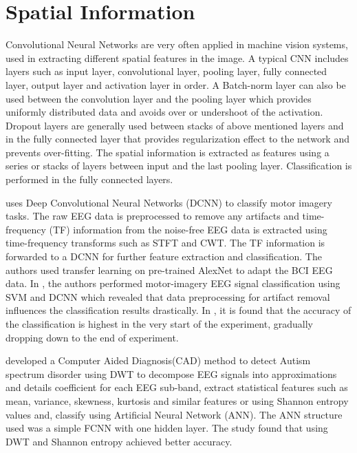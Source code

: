 \section{Spatial Information}

Convolutional Neural Networks are very often applied in machine vision systems, used in extracting different spatial features in the image. A typical CNN includes layers such as input layer, convolutional layer, pooling layer, fully connected layer, output layer and activation layer in order. A Batch-norm layer can also be used between the convolution layer and the pooling layer which provides uniformly distributed data and avoids over or undershoot of the activation. Dropout layers are generally used between stacks of above mentioned layers and in the fully connected layer that provides regularization effect to the network and prevents over-fitting. The spatial information is extracted as features using a series or stacks of layers between input and the last pooling layer. Classification is performed in the fully connected layers. 

\cite{2019_MI_CNN_WT} uses Deep Convolutional Neural Networks (DCNN) to classify motor imagery tasks. The raw EEG data is preprocessed to remove any artifacts and time-frequency (TF)  information from the noise-free EEG data is extracted using time-frequency transforms such as STFT and CWT. The TF information is forwarded to a DCNN for further feature extraction and classification. The authors used transfer learning on pre-trained AlexNet to adapt the BCI EEG data. In \cite{2018_BCI_SVM_DNN}, the authors performed motor-imagery EEG signal classification using SVM and DCNN which revealed that data preprocessing for artifact removal influences the classification results drastically. In \cite{2021_MI_DCNN}, it is found that the accuracy of the classification is highest in the very start of the experiment, gradually dropping down to the end of experiment.

\cite{2017_EEG_Wavelet_ANN} developed a Computer Aided Diagnosis(CAD) method to detect Autism spectrum disorder using DWT to decompose EEG signals into approximations and details coefficient for each EEG sub-band, extract statistical features such as mean, variance, skewness, kurtosis and similar features or using Shannon entropy values and, classify using Artificial Neural Network (ANN). The ANN structure used was a simple FCNN with one hidden layer. The study found that using DWT and Shannon entropy achieved better accuracy. 

